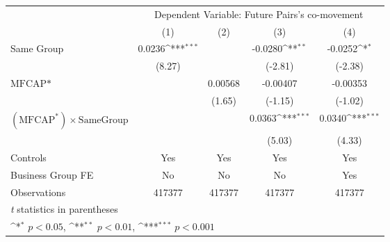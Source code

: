 {
\def\sym#1{\ifmmode^{#1}\else\(^{#1}\)\fi}
\begin{tabular}{l*{4}{c}}
\hline\hline
                &\multicolumn{4}{c}{Dependent Variable: Future Pairs's co-movement}         \\\cmidrule(lr){2-5}
                &\multicolumn{1}{c}{(1)}         &\multicolumn{1}{c}{(2)}         &\multicolumn{1}{c}{(3)}         &\multicolumn{1}{c}{(4)}         \\
\hline
Same Group      &   0.0236\sym{***}&                  &  -0.0280\sym{**} &  -0.0252\sym{*}  \\
                &   (8.27)         &                  &  (-2.81)         &  (-2.38)         \\
[1em]
$ \text{MFCAP*} $&                  &  0.00568         & -0.00407         & -0.00353         \\
                &                  &   (1.65)         &  (-1.15)         &  (-1.02)         \\
[1em]
 $ (\text{MFCAP}^*) \times {\text{SameGroup} }  $ &                  &                  &   0.0363\sym{***}&   0.0340\sym{***}\\
                &                  &                  &   (5.03)         &   (4.33)         \\
\hline
Controls        &      Yes         &      Yes         &      Yes         &      Yes         \\
Business Group FE&       No         &       No         &       No         &      Yes         \\
Observations    &   417377         &   417377         &   417377         &   417377         \\
\hline\hline
\multicolumn{5}{l}{\footnotesize \textit{t} statistics in parentheses}\\
\multicolumn{5}{l}{\footnotesize \sym{*} \(p<0.05\), \sym{**} \(p<0.01\), \sym{***} \(p<0.001\)}\\
\end{tabular}
}

